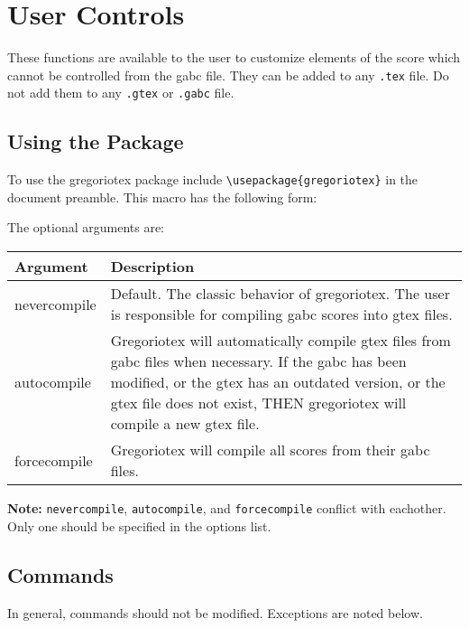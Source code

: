 \section{User Controls}

These functions are available to the user to customize elements of the
score which cannot be controlled from the gabc file. They can be added
to any \verb=.tex= file. Do not add them to any \verb=.gtex= or
\verb=.gabc= file.

\subsection{Using the Package}

To use the gregoriotex package include \verb=\usepackage{gregoriotex}=
in the document preamble. This macro has the following form:


The optional arguments are:

\bigskip{}
\begin{tabular}{lp{}}
  Argument & Description \\
  \hline
  nevercompile & Default. The classic behavior of gregoriotex. The user is
                 responsible for compiling gabc scores into gtex files.\\
  autocompile & Gregoriotex will automatically compile gtex files from gabc
                files when necessary. If the gabc has been modified, or the
                gtex has an outdated version, or the gtex file does not exist,
                THEN gregoriotex will compile a new gtex file.\\
  forcecompile & Gregoriotex will compile all scores from their gabc files.\\
\end{tabular}\bigskip

\textbf{Note:} \verb=nevercompile=, \verb=autocompile=, and
\verb=forcecompile= conflict with eachother. Only one should be
specified in the options list.

\subsection{Commands}

In general, commands should not be modified.  Exceptions are noted below.

